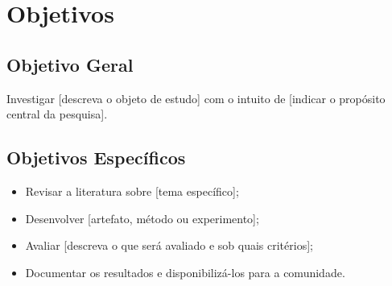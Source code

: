 \section{Objetivos}\label{sec:objetivos}

\subsection{Objetivo Geral}


Investigar [descreva o objeto de estudo] com o intuito de [indicar o propósito central da pesquisa].

\subsection{Objetivos Específicos}


\begin{itemize}
    \item Revisar a literatura sobre [tema específico];
    \item Desenvolver [artefato, método ou experimento];
    \item Avaliar [descreva o que será avaliado e sob quais critérios];
    \item Documentar os resultados e disponibilizá-los para a comunidade.
\end{itemize}